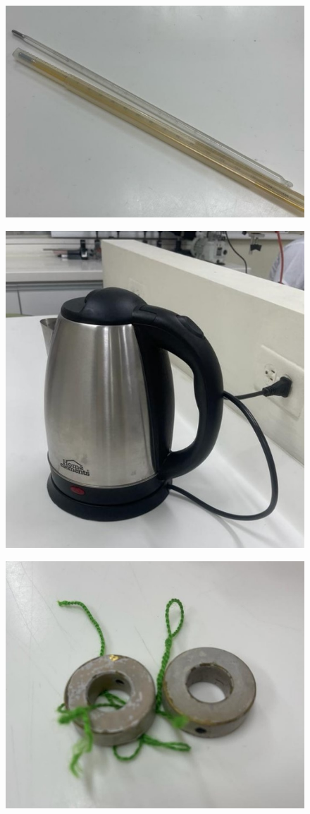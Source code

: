 \documentclass[letterpaper, 12pt]{article}
\begin{document}
\begin{figure}[H]
      \begin{center}
            \includegraphics[width=.5\linewidth]{./Images/Montaje2.jpg}
            \caption{}
      \end{center}
\end{figure}

\begin{figure}[H]
      \begin{center}
            \includegraphics[width=.5\linewidth]{./Images/Montaje3.jpg}
            \caption{}
      \end{center}
\end{figure}

\begin{figure}[H]
      \begin{center}
            \includegraphics[width=.5\linewidth]{./Images/Montaje4.jpg}
            \caption{}
      \end{center}
\end{figure}
\end{document}
